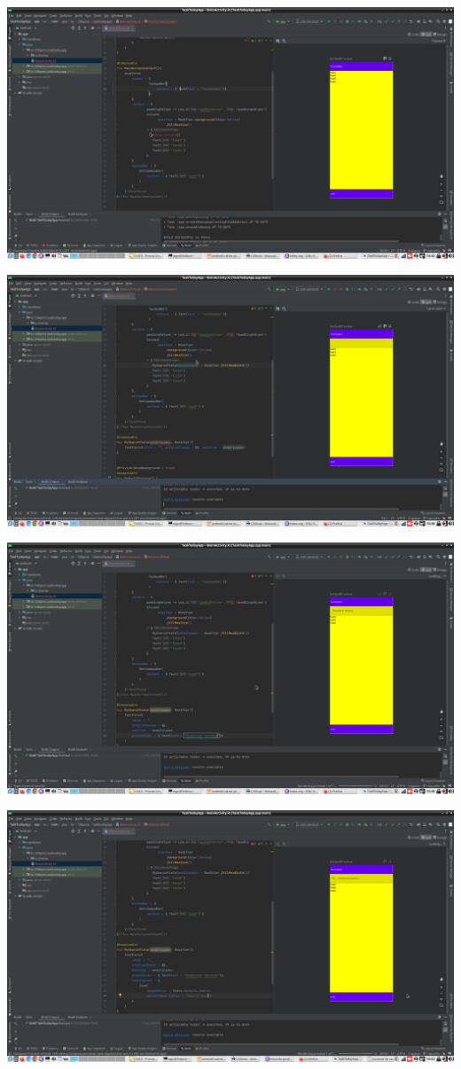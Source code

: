 \documentclass[11pt]{article}
\begin{document}
\begin{center}
\includegraphics[width=.9\linewidth]{./Captura de tela de 2023-03-29 16-43-31.png}
\end{center}
\begin{center}
\includegraphics[width=.9\linewidth]{./Captura de tela de 2023-03-29 16-46-31.png}
\end{center}
\begin{center}
\includegraphics[width=.9\linewidth]{./Captura de tela de 2023-03-29 16-48-36.png}
\end{center}
\begin{center}
\includegraphics[width=.9\linewidth]{./Captura de tela de 2023-03-29 16-52-50.png}
\end{center}
\end{document}
